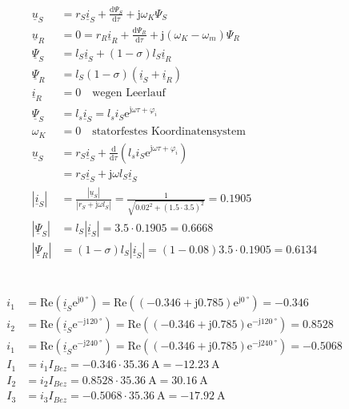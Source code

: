 \documentclass[11pt,a4paper]{scrartcl}
\newcommand{\mybr}[1]{\left(#1\right)}
\renewcommand{\j}{\mathrm{j}}
\renewcommand{\u}{\underline{u}}
\renewcommand{\i}{\underline{i}}
\newcommand{\PPsi}{\underline{\Psi}}
\newcommand{\0}{_{\mybr{0}}}
\newcommand{\1}{_{\mybr{1}}}
\newcommand{\2}{_{\mybr{2}}}
\renewcommand{\e}{\mathrm{e}}
\renewcommand{\d}{\mathrm{d}}
\renewcommand{\Re}{\mathrm{Re}}
\begin{document}
\section{}
\begin{align}
\u_S&=r_S\i_S+\frac{\d\Psi_S}{\d\tau}+\j\omega_K\Psi_S\\
\u_R&=0=r_R\i_R+\frac{\d\Psi_R}{\d\tau}+\j\mybr{\omega_K-\omega_m}\Psi_R\\
\PPsi_S&=l_S\i_S+\mybr{1-\sigma}l_S\i_R\\
\PPsi_R&=l_S\mybr{1-\sigma}\mybr{\i_S+\i_R}\\
\i_R&=0\quad \text{wegen Leerlauf}\\
\PPsi_S&=l_s\i_S=l_s i_S\e^{\j\omega\tau+\varphi_i}\\
\omega_K&=0\quad\text{statorfestes Koordinatensystem}\\
\u_S&=r_S\i_S+\frac{\d}{\d\tau}\mybr{l_s i_S\e^{\j\omega\tau+\varphi_i}}\\
&=r_S\i_S+\j\omega l_S \i_S\\
\left|\i_S\right|&=\frac{\left|\u_S\right|}{\left|r_S+\j\omega l_S\right|}=\frac{1}{\sqrt{\num{0.02}^2+\mybr{\num{1.5}\cdot\num{3.5}}^2}}=\num{0.1905}\\
\left|\PPsi_S\right|&=l_S\left|\i_S\right|=\num{3.5}\cdot\num{0.1905}=\num{0.6668}\\
\left|\PPsi_R\right|&=\mybr{1-\sigma}l_S\left|\i_S\right|=\mybr{1-\num{0.08}}\num{3.5}\cdot\num{0.1905}=\num{0.6134}
\end{align}

\section{}
\subsection{}
\begin{align}
i_1&=\Re\mybr{\i_S\e^{\j\SI{0}{\degree}}}=\Re\mybr{\mybr{\num{-0.346}+\j\num{0.785}}\e^{\j\SI{0}{\degree}}}=\num{-0.346}\\
i_2&=\Re\mybr{\i_S\e^{-\j\SI{120}{\degree}}}=\Re\mybr{\mybr{\num{-0.346}+\j\num{0.785}}\e^{-\j\SI{120}{\degree}}}=\num{0.8528}\\
i_1&=\Re\mybr{\i_S\e^{-\j\SI{240}{\degree}}}=\Re\mybr{\mybr{\num{-0.346}+\j\num{0.785}}\e^{-\j\SI{240}{\degree}}}=\num{-0.5068}\\
I_1&=i_1I_{Bez}=\num{-0.346}\cdot\SI{35.36}{\ampere}=\SI{-12.23}{\ampere}\\
I_2&=i_2I_{Bez}=\num{0.8528}\cdot\SI{35.36}{\ampere}=\SI{30.16}{\ampere}\\
I_3&=i_3I_{Bez}=\num{-0.5068}\cdot\SI{35.36}{\ampere}=\SI{-17.92}{\ampere}
\end{align}
\end{document}

